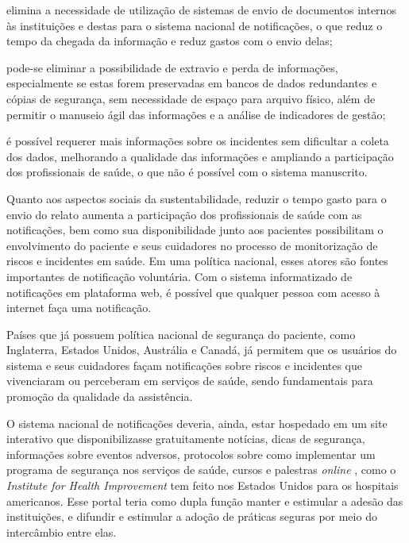 \documentclass{article}
\begin{document}

elimina a necessidade de utilização de sistemas de envio de documentos internos às
            instituições e destas para o sistema nacional de notificações, o que reduz o tempo da
            chegada da informação e reduz gastos com o envio delas;

pode-se eliminar a possibilidade de extravio e perda de informações, especialmente se
            estas forem preservadas em bancos de dados redundantes e cópias de segurança, sem
            necessidade de espaço para arquivo físico, além de permitir o manuseio ágil das
            informações e a análise de indicadores de gestão;

é possível requerer mais informações sobre os incidentes sem dificultar a coleta dos
            dados, melhorando a qualidade das informações e ampliando a participação dos
            profissionais de saúde, o que não é possível com o sistema manuscrito.

Quanto aos aspectos sociais da sustentabilidade, reduzir o tempo gasto para o envio do
        relato aumenta a participação dos profissionais de saúde com as notificações, bem como sua
        disponibilidade junto aos pacientes possibilitam o envolvimento do paciente e seus
        cuidadores no processo de monitorização de riscos e incidentes em saúde. Em uma política
        nacional, esses atores são fontes importantes de notificação voluntária. Com o sistema
        informatizado de notificações em plataforma web, é possível que qualquer pessoa com acesso à
        internet faça uma notificação.

Países que já possuem política nacional de segurança do paciente, como Inglaterra, Estados
        Unidos, Austrália e Canadá, já permitem que os usuários do sistema e seus cuidadores façam
        notificações sobre riscos e incidentes que vivenciaram ou perceberam em serviços de saúde,
        sendo fundamentais para promoção da qualidade da assistência.

O sistema nacional de notificações deveria, ainda, estar hospedado em um site interativo
        que disponibilizasse gratuitamente notícias, dicas de segurança, informações sobre eventos
        adversos, protocolos sobre como implementar um programa de segurança nos serviços de saúde,
        cursos e palestras %
\textit{online}
 , como o %
\textit{Institute for Health
          Improvement}
 tem feito nos Estados Unidos para os hospitais americanos. Esse
        portal teria como dupla função manter e estimular a adesão das instituições, e difundir e
        estimular a adoção de práticas seguras por meio do intercâmbio entre elas.
\end{document}
